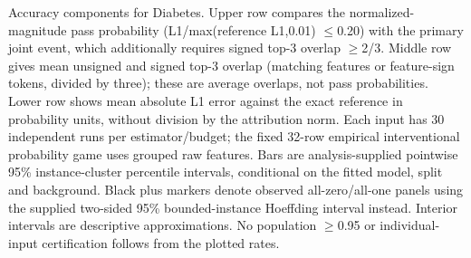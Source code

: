 Accuracy components for Diabetes. Upper row compares the normalized-magnitude pass probability (L1/max(reference L1,0.01) $\leq$0.20) with the primary joint event, which additionally requires signed top-3 overlap $\geq$2/3. Middle row gives mean unsigned and signed top-3 overlap (matching features or feature-sign tokens, divided by three); these are average overlaps, not pass probabilities. Lower row shows mean absolute L1 error against the exact reference in probability units, without division by the attribution norm. Each input has 30 independent runs per estimator/budget; the fixed 32-row empirical interventional probability game uses grouped raw features. Bars are analysis-supplied pointwise 95\% instance-cluster percentile intervals, conditional on the fitted model, split and background. Black plus markers denote observed all-zero/all-one panels using the supplied two-sided 95\% bounded-instance Hoeffding interval instead. Interior intervals are descriptive approximations. No population $\geq$0.95 or individual-input certification follows from the plotted rates.
